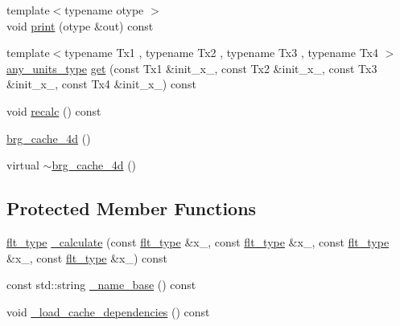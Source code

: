 \begin{DoxyCompactItemize}
\item 
{\footnotesize template$<$typename otype $>$ }\\void \hyperlink{classIceBRG_1_1brg__cache__4d_a74712ddedeecdca2c8ad01e589286f61}{print} (otype \&out) const 
\item 
{\footnotesize template$<$typename Tx1 , typename Tx2 , typename Tx3 , typename Tx4 $>$ }\\\hyperlink{namespaceIceBRG_a3101fc159e191fa99c4ec14e445df96e}{any\+\_\+units\+\_\+type} \hyperlink{classIceBRG_1_1brg__cache__4d_ae81df26be32f9eb8baf33e1b4ce8a9e4}{get} (const Tx1 \&init\+\_\+x\+\_, const Tx2 \&init\+\_\+x\+\_, const Tx3 \&init\+\_\+x\+\_, const Tx4 \&init\+\_\+x\+\_) const 
\item 
void \hyperlink{classIceBRG_1_1brg__cache__4d_aeceab734e4890f5c4322a47b8ba22abb}{recalc} () const 
\item 
\hyperlink{classIceBRG_1_1brg__cache__4d_a3bafa85228c9cac7e919303d4637a510}{brg\+\_\+cache\+\_\+4d} ()
\item 
virtual \hyperlink{classIceBRG_1_1brg__cache__4d_a1d78a4f84020a8fdf7ef85b0e7d7772c}{$\sim$brg\+\_\+cache\+\_\+4d} ()
\end{DoxyCompactItemize}
\subsection*{Protected Member Functions}
\begin{DoxyCompactItemize}
\item 
\hyperlink{lib_2IceBRG__main_2common_8h_ad0f130a56eeb944d9ef2692ee881ecc4}{flt\+\_\+type} \hyperlink{classIceBRG_1_1brg__cache__4d_a7c73fe2ee294ba85fe0d6d51dd0f1156}{\+\_\+calculate} (const \hyperlink{lib_2IceBRG__main_2common_8h_ad0f130a56eeb944d9ef2692ee881ecc4}{flt\+\_\+type} \&x\+\_, const \hyperlink{lib_2IceBRG__main_2common_8h_ad0f130a56eeb944d9ef2692ee881ecc4}{flt\+\_\+type} \&x\+\_, const \hyperlink{lib_2IceBRG__main_2common_8h_ad0f130a56eeb944d9ef2692ee881ecc4}{flt\+\_\+type} \&x\+\_, const \hyperlink{lib_2IceBRG__main_2common_8h_ad0f130a56eeb944d9ef2692ee881ecc4}{flt\+\_\+type} \&x\+\_) const 
\item 
const std\+::string \hyperlink{classIceBRG_1_1brg__cache__4d_a422e37f487c9c39ce42d26e3b1866693}{\+\_\+name\+\_\+base} () const 
\item 
void \hyperlink{classIceBRG_1_1brg__cache__4d_af79c67f2dfccfdfbfcfed081d65e07af}{\+\_\+load\+\_\+cache\+\_\+dependencies} () const 
\end{DoxyCompactItemize}


